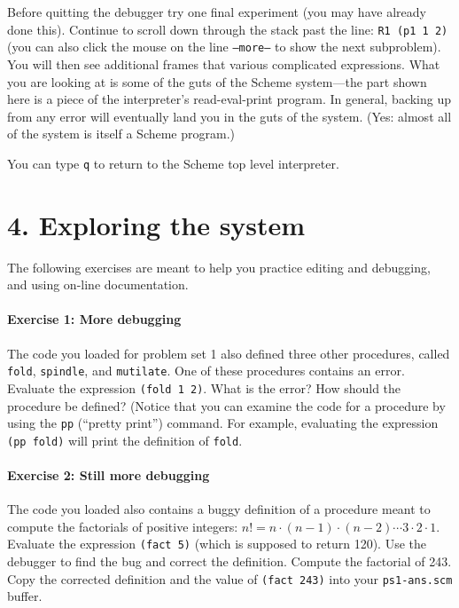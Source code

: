 Before quitting the debugger try one final experiment (you may have
already done this).  Continue to scroll down through the stack past
the line: {\tt R1 (p1 1 2)} (you can also click the mouse on the line
{\tt --more--} to show the next subproblem).  You will then see
additional frames that various complicated expressions.  What you
are looking at is some of the guts of the Scheme system---the part
shown here is a piece of the interpreter's read-eval-print program.
In general, backing up from any error will eventually land you in the
guts of the system. (Yes: almost all of the system is itself a Scheme
program.)

You can type {\tt q} to return to the Scheme top level interpreter.

\section{4. Exploring the system}

The following exercises are meant to help you practice editing and
debugging, and using on-line documentation.

\paragraph{Exercise 1:  More debugging}

The code you loaded for problem set 1 also defined three other procedures,
called {\tt fold}, {\tt spindle}, and {\tt mutilate}.  One of these
procedures contains an error.  Evaluate the expression {\tt (fold 1 2)}.
What is the error?  How should the procedure be defined?  (Notice that you
can examine the code for a procedure by using the {\tt pp} (``pretty
print'') command.  For example, evaluating the expression {\tt (pp fold)}
will print the definition of {\tt fold}.

\paragraph{Exercise 2: Still more debugging}

The code you loaded also contains a buggy definition of a procedure meant
to compute the factorials of positive integers:
$n!=n\cdot(n-1)\cdot(n-2)\cdots3\cdot2\cdot1$.  Evaluate the expression
{\tt (fact 5)} (which is supposed to return 120).  Use the debugger to
find the bug and correct the definition.  Compute the factorial of 243.
Copy the corrected definition and the value of {\tt (fact 243)} into your
{\tt ps1-ans.scm} buffer.

